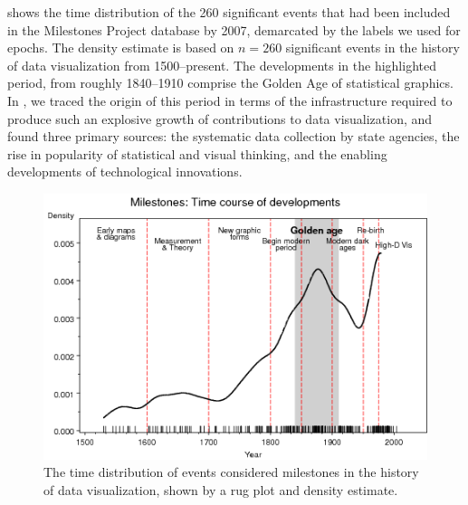  shows the time distribution of the 260 significant 
events that had been included in the Milestones Project database by 2007, 
demarcated by the labels we used for epochs.  
The density estimate is based on $n=260$ significant events in the history of data visualization from 1500--present.
The developments in the highlighted period, from roughly 1840--1910 comprise the Golden Age of statistical graphics.
In \citet{Friendly:2008:golden}, we traced the origin of this period in terms 
of the infrastructure required to produce such an explosive growth of 
contributions to data visualization, and found three primary sources: the 
systematic data collection by state agencies, the rise in popularity of 
statistical and visual thinking, and the enabling developments of technological 
innovations.
\begin{figure}[!htb]
  \centering
  \includegraphics[width=.9\textwidth,clip]{fig/mileyears4}
  \caption{The time distribution of events considered milestones in the history of data visualization, shown by a rug plot and density estimate.}
  \label{fig:mileyears4}
\end{figure}